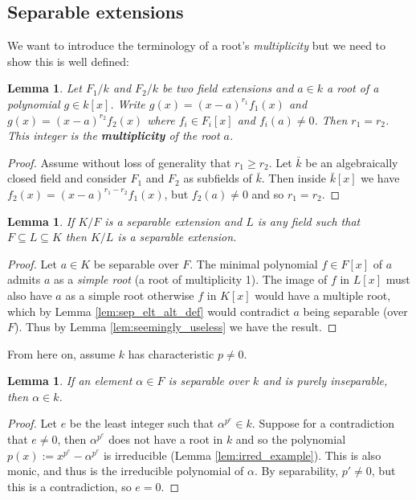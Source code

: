\documentclass[12pt]{article}
\theoremstyle{plain}
\newtheorem{lemma}[thm]{Lemma}
\theoremstyle{definition}
\begin{document}
\subsection{Separable extensions}
%
We want to introduce the terminology of a root's \emph{multiplicity} but we need to show this is well defined:
%
\begin{lemma}
Let $F_1/k$ and $F_2/k$ be two field extensions and $a \in k$ a root of a polynomial $g \in k[x]$. Write $g(x) = (x - a)^{r_1}f_1(x)$ and $g(x) = (x-a)^{r_2}f_2(x)$ where $f_i \in F_i[x]$ and $f_i(a) \neq 0$. Then $r_1 = r_2$. This integer is the \textbf{multiplicity} of the root $a$.
\end{lemma}
\begin{proof}
Assume without loss of generality that $r_1 \geq r_2$. Let $\bar{k}$ be an algebraically closed field and consider $F_1$ and $F_2$ as subfields of $\bar{k}$. Then inside $\bar{k}[x]$ we have $f_2(x) = (x-a)^{r_1 - r_2}f_1(x)$, but $f_2(a) \neq 0$ and so $r_1 = r_2$.
\end{proof}
%
\begin{lemma}
\label{lem:sep_ext_trans_sort_of}
If $K/F$ is a separable extension and $L$ is any field such that $F \subseteq L \subseteq K$ then $K/L$ is a separable extension.
\end{lemma}
\begin{proof}
Let $a \in K$ be separable over $F$. The minimal polynomial $f \in F[x]$ of $a$ admits $a$ as a \emph{simple root} (a root of multiplicity 1). The image of $f$ in $L[x]$ must also have $a$ as a simple root otherwise $f$ in $K[x]$ would have a multiple root, which by Lemma \ref{lem:sep_elt_alt_def} would contradict $a$ being separable (over $F$). Thus by Lemma \ref{lem:seemingly_useless} we have the result.
\end{proof}
From here on, assume $k$ has characteristic $p \neq 0$.
\begin{lemma}
\label{lem:insep_purely_sep}
If an element $\alpha \in F$ is separable over $k$ and is purely inseparable, then $\alpha \in k$.
\end{lemma}
\begin{proof}
Let $e$ be the least integer such that $\alpha^{p^e} \in k$. Suppose for a contradiction that $e \neq 0$, then $\alpha^{p^e}$ does not have a root in $k$ and so the polynomial $p(x) := x^{p^e} - \alpha^{p^e}$ is irreducible (Lemma \ref{lem:irred_example}). This is also monic, and thus is the irreducible polynomial of $\alpha$. By separability, $p' \neq 0$, but this is a contradiction, so $e = 0$.
\end{proof}
\end{document}
